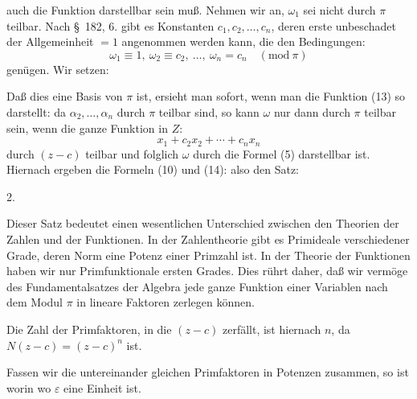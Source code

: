 auch die Funktion \grqq{} darstellbar sein muß. Nehmen wir an,
$\omega_1$ sei nicht durch $\pi$ teilbar. Nach \S\ 182, 6. gibt es Konstanten
$c_1, c_2, \ldots, c_n$, deren erste unbeschadet der Allgemeinheit $= 1$
angenommen werden kann, die den Bedingungen:
\[
\omega_1 \equiv 1, \ \omega_2 \equiv c_2, \ \ldots, \ \omega_n = c_n \quad (\mathrm{mod}\ \pi)
\]
genügen. Wir setzen:

Daß dies eine Basis von $\pi$ ist, ersieht man sofort, wenn man
die Funktion (13) so darstellt:
da $\alpha_2, \ldots, \alpha_n$ durch $\pi$ teilbar sind, so kann $\omega$ nur dann durch
$\pi$ teilbar sein, wenn die ganze Funktion in $Z$:
\[
x_1 + c_2x_2 + \cdots + c_nx_n
\]
durch $(z - c)$ teilbar und folglich $\omega$ durch die Formel (5) darstellbar
ist. Hiernach ergeben die Formeln (10) und (14):
also den Satz:

2. 

Dieser Satz bedeutet einen wesentlichen Unterschied zwischen
den Theorien der Zahlen und der Funktionen. In der Zahlentheorie
 gibt es Primideale verschiedener Grade, deren Norm eine
Potenz einer Primzahl ist. In der Theorie der Funktionen haben
wir nur Primfunktionale ersten Grades. Dies rührt daher, daß
wir vermöge des Fundamentalsatzes der Algebra jede ganze
Funktion einer Variablen nach dem Modul $\pi$ in lineare Faktoren
zerlegen können.

Die Zahl der Primfaktoren, in die $(z - c)$ zerfällt, ist hiernach
 $n$, da $N(z-c) = (z-c)^n$ ist.

Fassen wir die untereinander gleichen Primfaktoren in
Potenzen zusammen, so ist
worin
wo $\varepsilon$ eine Einheit ist.
